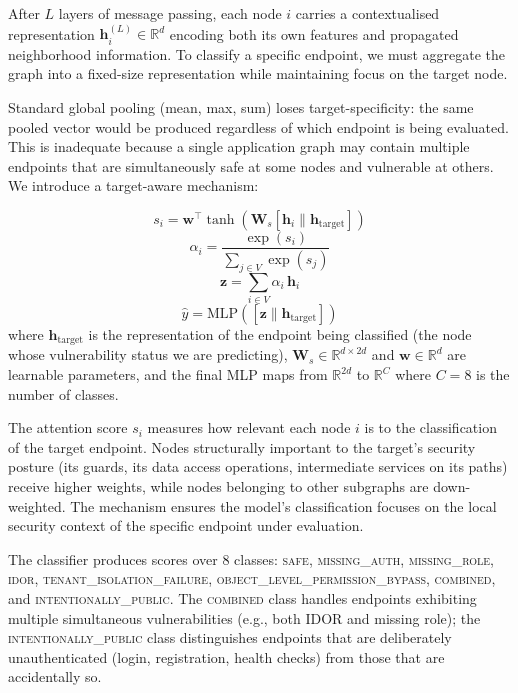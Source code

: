 After $L$ layers of message passing, each node $i$ carries a contextualised
representation $\mathbf{h}_i^{(L)} \in \mathbb{R}^{d}$ encoding both its own
features and propagated neighborhood information. To classify a specific
endpoint, we must aggregate the graph into a fixed-size representation while
maintaining focus on the target node.

Standard global pooling (mean, max, sum) loses target-specificity: the same
pooled vector would be produced regardless of which endpoint is being
evaluated. This is inadequate because a single application graph may contain
multiple endpoints that are simultaneously safe at some nodes and vulnerable
at others. We introduce a target-aware mechanism:

\begin{equation}
\label{eq:det-score}
s_i = \mathbf{w}^{\top} \tanh\!\left(\mathbf{W}_s \left[\mathbf{h}_i \|
\mathbf{h}_{\mathrm{target}}\right]\right)
\end{equation}
\begin{equation}
\label{eq:det-alpha}
\alpha_i = \frac{\exp(s_i)}{\sum_{j \in V} \exp(s_j)}
\end{equation}
\begin{equation}
\label{eq:det-pool}
\mathbf{z} = \sum_{i \in V} \alpha_i \, \mathbf{h}_i
\end{equation}
\begin{equation}
\label{eq:det-class}
\hat{y} = \mathrm{MLP}\!\left(\left[\mathbf{z} \|
\mathbf{h}_{\mathrm{target}}\right]\right)
\end{equation}
where $\mathbf{h}_{\mathrm{target}}$ is the representation of the endpoint
being classified (the node whose vulnerability status we are predicting),
$\mathbf{W}_s \in \mathbb{R}^{d \times 2d}$ and $\mathbf{w} \in
\mathbb{R}^{d}$ are learnable parameters, and the final MLP maps from
$\mathbb{R}^{2d}$ to $\mathbb{R}^{C}$ where $C = 8$ is the number of
classes.

The attention score $s_i$ measures how relevant each node $i$ is to the
classification of the target endpoint. Nodes structurally important to the
target's security posture (its guards, its data access operations,
intermediate services on its paths) receive higher weights, while nodes
belonging to other subgraphs are down-weighted. The mechanism ensures the
model's classification focuses on the local security context of the specific
endpoint under evaluation.

The classifier produces scores over 8 classes: \textsc{safe},
\textsc{missing\_auth}, \textsc{missing\_role}, \textsc{idor},
\textsc{tenant\_isolation\_failure},
\textsc{object\_level\_permission\_bypass}, \textsc{combined}, and
\textsc{intentionally\_public}. The \textsc{combined} class handles
endpoints exhibiting multiple simultaneous vulnerabilities (e.g., both IDOR
and missing role); the \textsc{intentionally\_public} class distinguishes
endpoints that are deliberately unauthenticated (login, registration, health
checks) from those that are accidentally so.

